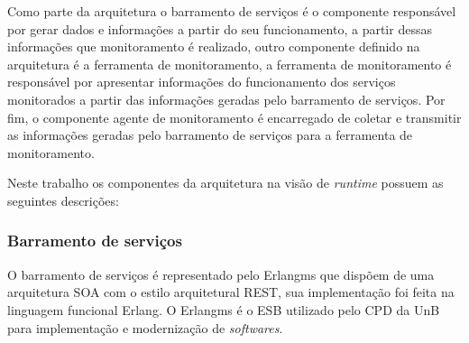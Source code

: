 Como parte da arquitetura o barramento de serviços é o componente responsável por gerar dados e informações a partir do seu funcionamento, a partir dessas informações que monitoramento é realizado, outro componente definido na arquitetura é a ferramenta de monitoramento, a ferramenta de monitoramento é responsável por apresentar informações do funcionamento dos serviços monitorados a partir das informações geradas pelo barramento de serviços. Por fim, o componente agente de monitoramento é encarregado de coletar e transmitir as informações geradas pelo barramento de serviços para a ferramenta de monitoramento.  

Neste trabalho os componentes da arquitetura na visão de \textit{runtime} possuem as seguintes descrições:

\subsubsection{Barramento de serviços}
O barramento de serviços é representado pelo Erlangms que dispõem de uma arquitetura SOA com o estilo arquitetural REST, sua implementação foi feita na linguagem funcional Erlang. O Erlangms é o \acrshort{ESB} utilizado pelo \acrshort{CPD} da \acrshort{UnB} para implementação e modernização de \textit{softwares}.

